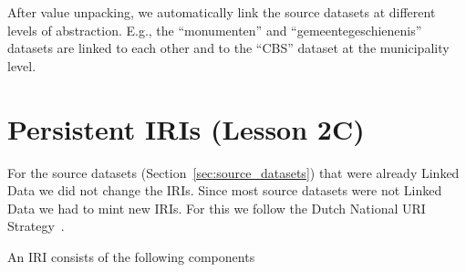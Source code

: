 \documentclass[a4paper]{scrartcl}
\begin{document}
After value unpacking, we automatically link the source datasets at
different levels of abstraction.  E.g., the ``monumenten'' and
``gemeentegeschienenis'' datasets are linked to each other and to the
``CBS'' dataset at the municipality level.



\section{Persistent IRIs (Lesson 2C)}
\label{sec:persistent_iris}

For the source datasets (Section~\ref{sec:source_datasets}) that were
already Linked Data we did not change the IRIs.  Since most source
datasets were not Linked Data we had to mint new IRIs.  For this we
follow the Dutch National URI Strategy~\cite{Overbeek2013}.

An IRI consists of the following components
\end{document}
